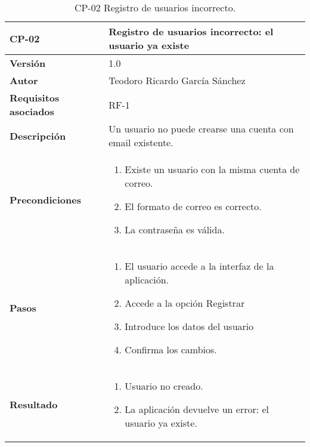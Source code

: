 \begin{table}[p]
	\centering
	\begin{tabularx}{\linewidth}{ p{} p{} }
		\toprule
		\textbf{CP-02}    & \textbf{Registro de usuarios incorrecto: el usuario ya existe}\\
		\toprule
		\textbf{Versión}              & 1.0    \\
		\textbf{Autor}                & Teodoro Ricardo García Sánchez \\
		\textbf{Requisitos asociados} & RF-1 \\
		\textbf{Descripción}          & Un usuario no puede crearse una cuenta con email existente.\\
		\textbf{Precondiciones}       &  
		\begin{enumerate}
			\def\labelenumi{\arabic{enumi}.}
			\tightlist
			\item Existe un usuario con la misma cuenta de correo.
			\item El formato de correo es correcto.
			\item La contraseña es válida.
		\end{enumerate}\\
		\textbf{Pasos}             &
		\begin{enumerate}
			\def\labelenumi{\arabic{enumi}.}
			\tightlist
			\item El usuario accede a la interfaz de la aplicación.
			\item Accede a la opción Registrar
			\item Introduce los datos del usuario
			\item Confirma los cambios.
		\end{enumerate}\\
		\textbf{Resultado}          & 
		\begin{enumerate}
			\item Usuario no creado.
			\item La aplicación devuelve un error: el usuario ya existe.
		\end{enumerate}\\
		\bottomrule
	\end{tabularx}
	\caption{CP-02 Registro de usuarios incorrecto.}
\end{table}

